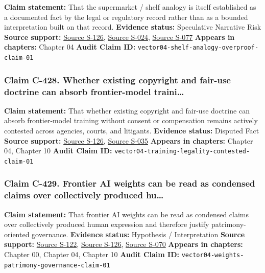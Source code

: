 \documentclass[
  american,
  11pt,
  letterpaper,
]{article}
\begin{document}
\textbf{Claim statement:} That the supermarket / shelf analogy is itself
established as a documented fact by the legal or regulatory record
rather than as a bounded interpretation built on that record.
\textbf{Evidence status:} Speculative Narrative Risk \textbf{Source
support:}
\hyperref[source-s-126-copyright-and-artificial-intelligence-part-3-generative-ai-training-pre-publication-version]{Source
S-126},
\hyperref[source-s-024-reddit-strikes-60m-deal-allowing-google-to-train-ai-models-on-its-posts-unveils-ipo-plans]{Source
S-024},
\hyperref[source-s-077-the-problem-with-annotation-human-labour-and-outsourcing-between-france-and-madagascar]{Source
S-077} \textbf{Appears in chapters:} Chapter 04 \textbf{Audit Claim ID:}
\texttt{vector04-shelf-analogy-overproof-claim-01}

\subsubsection{Claim C-428. Whether existing copyright and fair-use
doctrine can absorb frontier-model
traini\ldots{}}\label{claim-c-428-whether-existing-copyright-and-fair-use-doctrine-can-absorb-frontier-model-traini}

\textbf{Claim statement:} That whether existing copyright and fair-use
doctrine can absorb frontier-model training without consent or
compensation remains actively contested across agencies, courts, and
litigants. \textbf{Evidence status:} Disputed Fact \textbf{Source
support:}
\hyperref[source-s-126-copyright-and-artificial-intelligence-part-3-generative-ai-training-pre-publication-version]{Source
S-126},
\hyperref[source-s-035-bartz-et-al-v-anthropic-pbc-order-on-fair-use]{Source
S-035} \textbf{Appears in chapters:} Chapter 04, Chapter 10
\textbf{Audit Claim ID:}
\texttt{vector04-training-legality-contested-claim-01}

\subsubsection{Claim C-429. Frontier AI weights can be read as condensed
claims over collectively produced
hu\ldots{}}\label{claim-c-429-frontier-ai-weights-can-be-read-as-condensed-claims-over-collectively-produced-hu}

\textbf{Claim statement:} That frontier AI weights can be read as
condensed claims over collectively produced human expression and
therefore justify patrimony-oriented governance. \textbf{Evidence
status:} Hypothesis / Interpretation \textbf{Source support:}
\hyperref[source-s-122-ai-copyright-weights-a-new-frontier-in-intellectual-property-law]{Source
S-122},
\hyperref[source-s-126-copyright-and-artificial-intelligence-part-3-generative-ai-training-pre-publication-version]{Source
S-126},
\hyperref[source-s-070-bipartisan-house-task-force-report-on-artificial-intelligence]{Source
S-070} \textbf{Appears in chapters:} Chapter 00, Chapter 04, Chapter 10
\textbf{Audit Claim ID:}
\texttt{vector04-weights-patrimony-governance-claim-01}
\end{document}
